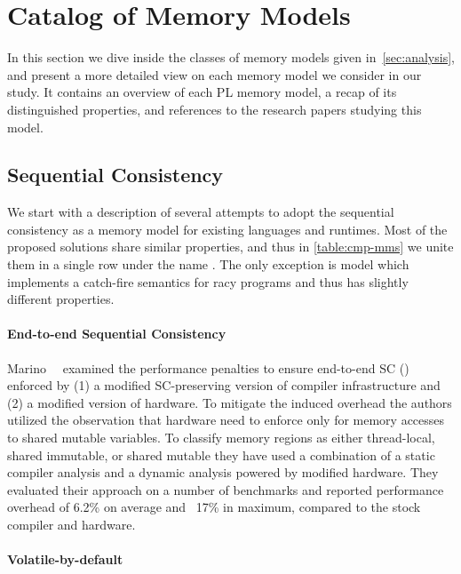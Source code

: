 \section{Catalog of Memory Models}
\label{sec:catalog}

In this section we dive inside the 
classes of memory models given in~\cref{sec:analysis},
and present a more detailed view 
on each memory model we consider in our study. 
It contains an overview of each PL memory model,
a recap of its distinguished properties,
and references to the research papers studying this model. 

\subsection{Sequential Consistency}
\label{sec:catalog:sc}

We start with a description of several attempts 
to adopt the sequential consistency as a memory model 
for existing languages and runtimes. 
Most of the proposed solutions share similar properties, 
and thus in \cref{table:cmp-mms} we unite them 
in a single row under the name \SC. 
The only exception is \DRFx model which implements
a catch-fire semantics for racy programs 
and thus has slightly different properties. 

\paragraph{End-to-end Sequential Consistency}

Marino~\etal~\cite{Marino-al:PLDI11, Singh-al:ISCA12} 
examined the performance penalties to ensure end-to-end SC (\EtESC)
enforced by (1) a modified SC-preserving version 
of \LLVM compiler infrastructure and 
(2) a modified version of \Intel hardware. 
To mitigate the induced overhead the authors 
utilized the observation that hardware need to 
enforce \SC only for memory accesses to shared mutable variables. 
To classify memory regions as either thread-local,
shared immutable, or shared mutable they have used 
a combination of a static compiler analysis and 
a dynamic analysis powered by modified hardware. 
They evaluated their approach on a number of benchmarks
and reported performance overhead of 6.2\% on average 
and ~17\% in maximum, compared to the stock \LLVM compiler 
and \Intel hardware. 

\paragraph{Volatile-by-default}

